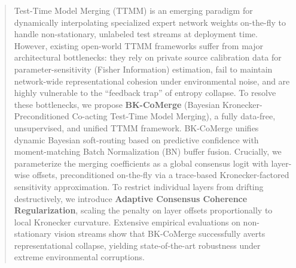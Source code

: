 \documentclass{article}
\theoremstyle{plain}
\theoremstyle{definition}
\theoremstyle{remark}
\begin{document}

\printAffiliationsAndNotice{}  %

\begin{abstract}
Test-Time Model Merging (TTMM) is an emerging paradigm for dynamically interpolating specialized expert network weights on-the-fly to handle non-stationary, unlabeled test streams at deployment time. However, existing open-world TTMM frameworks suffer from major architectural bottlenecks: they rely on private source calibration data for parameter-sensitivity (Fisher Information) estimation, fail to maintain network-wide representational cohesion under environmental noise, and are highly vulnerable to the ``feedback trap'' of entropy collapse. To resolve these bottlenecks, we propose \textbf{BK-CoMerge} (Bayesian Kronecker-Preconditioned Co-acting Test-Time Model Merging), a fully data-free, unsupervised, and unified TTMM framework. BK-CoMerge unifies dynamic Bayesian soft-routing based on predictive confidence with moment-matching Batch Normalization (BN) buffer fusion. Crucially, we parameterize the merging coefficients as a global consensus logit with layer-wise offsets, preconditioned on-the-fly via a trace-based Kronecker-factored sensitivity approximation. To restrict individual layers from drifting destructively, we introduce \textbf{Adaptive Consensus Coherence Regularization}, scaling the penalty on layer offsets proportionally to local Kronecker curvature. Extensive empirical evaluations on non-stationary vision streams show that BK-CoMerge successfully averts representational collapse, yielding state-of-the-art robustness under extreme environmental corruptions.
\end{abstract}
\end{document}
